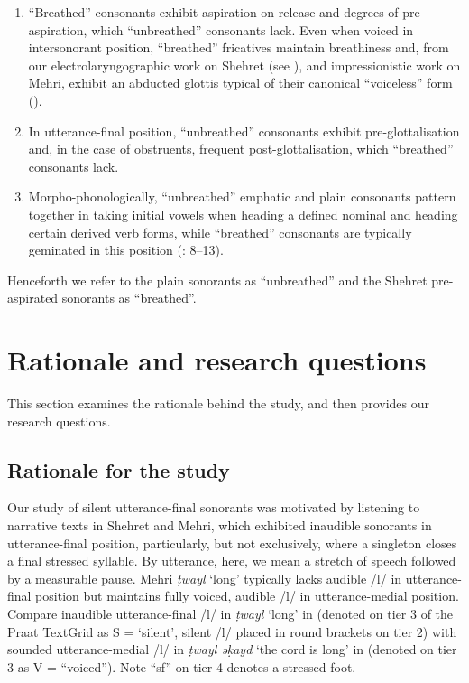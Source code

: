 \documentclass[output=paper]{langscibook}
\begin{document}
\begin{enumerate}
  \item ``Breathed''
  consonants exhibit aspiration on release and degrees of pre-aspiration, which ``unbreathed''
  consonants lack. Even when voiced in intersonorant position, ``breathed'' fricatives maintain breathiness and, from our electrolaryngographic work on Shehret (see ), and impressionistic work on Mehri, exhibit an abducted glottis typical of their canonical ``voiceless'' form (\citealt{HeselwoodEtAl2022}).
  \item \sloppy In utterance-final position, ``unbreathed'' consonants exhibit pre-glottalisa\-tion and, in the case of obstruents, frequent post-glottalisation, which ``breathed'' consonants lack.
  \item \fussy Morpho-phonologically, ``unbreathed'' emphatic and plain consonants pattern together in taking initial vowels when heading a defined nominal and heading certain derived verb forms, while ``breathed'' consonants are typically geminated in this position (\citealt{WatsonHeselwood2016}: 8–13).
\end{enumerate}

Henceforth we refer to the plain sonorants as ``unbreathed'' and the Shehret pre-aspirated sonorants as ``breathed''.

\section{Rationale and research questions} %
\label{sec:watson:3}
This section examines the rationale behind the study, and then provides our research questions.

\subsection{Rationale for the study}
\label{sec:watson:3.1}
Our study of silent utterance-final sonorants was motivated by listening to narrative texts in Shehret and Mehri, which exhibited inaudible sonorants in utterance-final position, particularly, but not exclusively, where a singleton closes a final stressed syllable. By utterance, here, we mean a stretch of speech followed by a measurable pause. Mehri \textit{ṭwayl} ‘long’ typically lacks audible \mbox{/l/} in utterance-final position but maintains fully voiced, audible \mbox{/l/} in utterance-medial position. Compare inaudible utterance-final \mbox{/l/} in \textit{ṭwayl} ‘long’ in  (denoted on tier 3 of the Praat TextGrid as S = ‘silent’, silent \mbox{/l/} placed in round brackets on tier 2) with sounded utterance-medial \mbox{/l/} in \textit{ṭwayl əḳayd} ‘the cord is long’ in  (denoted on tier 3 as
V = ``voiced'').
Note ``sf'' on tier 4 denotes a stressed foot.
\end{document}
